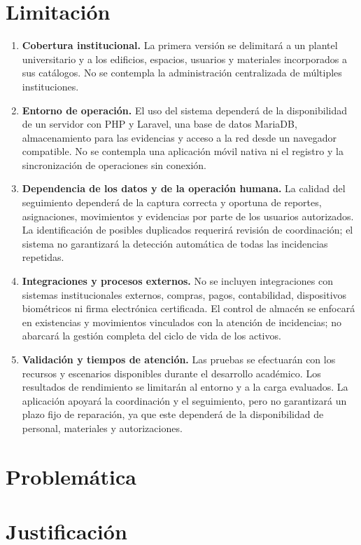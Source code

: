 \section{Limitación}
\begin{enumerate}
\item \textbf{Cobertura institucional.} La primera versión se delimitará a un plantel universitario y a los edificios, espacios, usuarios y materiales incorporados a sus catálogos. No se contempla la administración centralizada de múltiples instituciones.

\item \textbf{Entorno de operación.} El uso del sistema dependerá de la disponibilidad de un servidor con PHP y Laravel, una base de datos MariaDB, almacenamiento para las evidencias y acceso a la red desde un navegador compatible. No se contempla una aplicación móvil nativa ni el registro y la sincronización de operaciones sin conexión.

\item \textbf{Dependencia de los datos y de la operación humana.} La calidad del seguimiento dependerá de la captura correcta y oportuna de reportes, asignaciones, movimientos y evidencias por parte de los usuarios autorizados. La identificación de posibles duplicados requerirá revisión de coordinación; el sistema no garantizará la detección automática de todas las incidencias repetidas.

\item \textbf{Integraciones y procesos externos.} No se incluyen integraciones con sistemas institucionales externos, compras, pagos, contabilidad, dispositivos biométricos ni firma electrónica certificada. El control de almacén se enfocará en existencias y movimientos vinculados con la atención de incidencias; no abarcará la gestión completa del ciclo de vida de los activos.

\item \textbf{Validación y tiempos de atención.} Las pruebas se efectuarán con los recursos y escenarios disponibles durante el desarrollo académico. Los resultados de rendimiento se limitarán al entorno y a la carga evaluados. La aplicación apoyará la coordinación y el seguimiento, pero no garantizará un plazo fijo de reparación, ya que este dependerá de la disponibilidad de personal, materiales y autorizaciones.
\end{enumerate}


\section{Problemática}


\section{Justificación}

